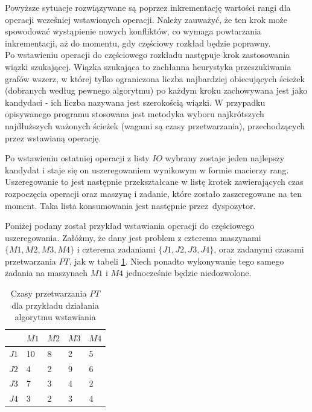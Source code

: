 \documentclass[brudnopis]{xmgr}
\begin{document}
Powyższe sytuacje rozwiązywane są poprzez inkrementację wartości rangi dla operacji wcześniej wstawionych operacji. Należy zauważyć, że ten krok może spowodować wystąpienie nowych konfliktów, co wymaga powtarzania inkrementacji, aż do momentu, gdy częściowy rozkład będzie poprawny.\\

Po wstawieniu operacji do częściowego rozkładu następuje krok zastosowania wiązki szukającej.
Wiązka szukająca to zachłanna heurystyka przeszukiwania grafów wszerz, w której tylko ograniczona liczba najbardziej obiecujących ścieżek (dobranych według pewnego algorytmu) po każdym kroku zachowywana jest jako kandydaci - ich liczba nazywana jest szerokością wiązki.
W przypadku opisywanego programu stosowana jest metodyka wyboru najkrótszych najdłuższych ważonych ścieżek (wagami są czasy przetwarzania), przechodzących przez wstawianą operację.

Po wstawieniu ostatniej operacji z listy $IO$ wybrany zostaje jeden najlepszy kandydat i staje się on uszeregowaniem wynikowym w formie macierzy rang.
Uszeregowanie to jest następnie przekształcane w listę krotek zawierających czas rozpoczęcia operacji oraz maszynę i zadanie, które zostało zaszeregowane na ten moment. Taka lista konsumowania jest następnie przez~dyspozytor.
\medskip

Poniżej podany został przykład wstawiania operacji do częściowego uszeregowania.
Załóżmy, że dany jest problem z czterema maszynami\\
$\{M1, M2, M3, M4\}$ i czterema zadaniami $\{J1, J2, J3, J4\}$, oraz zadanymi czasami przetwarzania $PT$, jak w tabeli \ref{tab:example_pt}.
Niech ponadto wykonywanie tego samego zadania na maszynach $M1$ i $M4$ jednocześnie będzie niedozwolone.

\begin{table}[!tbh]
\begin{tabular}{|l|l|l|l|l|} \hline
     & $M1$ & $M2$ & $M3$ & $M4$ \\ \hline
$J1$ & 10 & 8 & 2 & 5 \\ \hline
$J2$ & 4 & 2 & 9 & 6 \\ \hline
$J3$ & 7 & 3 & 4 & 2 \\ \hline
$J4$ & 3 & 2 & 3 & 4 \\ \hline
\end{tabular}
\caption{Czasy przetwarzania $PT$ dla przykładu działania algorytmu wstawiania\label{tab:example_pt}}
\end{table}\medskip
\end{document}
